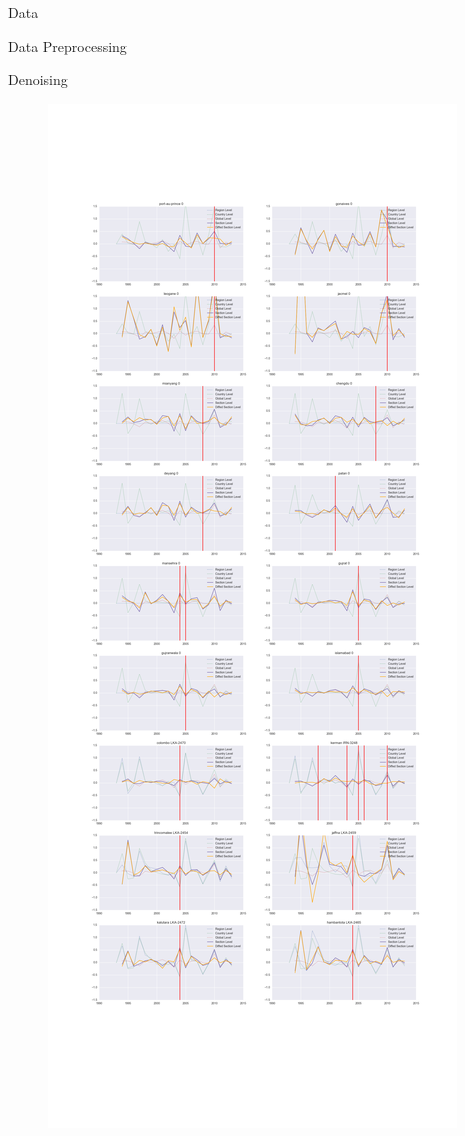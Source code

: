 \documentclass[12pt,fleqn,leqno,letterpaper]{article}
\begin{document}
\begin{section}{Data}
\begin{subsection}{Data Preprocessing}
\begin{subsubsection}{Denoising}
\begin{figure}[t!]
        \includegraphics[width=1\linewidth]{pca_balancer_diffs}\label{fig:weighted_balanced_luminosity_sum_series} %

\end{figure}
\end{subsubsection}
\end{subsection}
\end{section}
\end{document}
